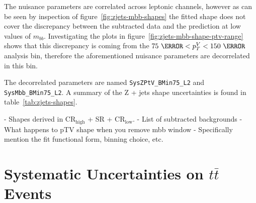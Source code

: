 The nuisance parameters are correlated across leptonic channels, however as can
be seen by inspection of figure~\ref{fig:zjets-mbb-shapes} the fitted shape does
not cover the discrepancy between the subtracted data and the prediction at low
values of $m_{bb}$. Investigating the plots in
figure~\ref{fig:zjets-mbb-shape-ptv-range} shows that this discrepancy is coming
from the $75~\GeV < p_T^V < 150~\GeV$ analysis bin, therefore the aforementioned
nuisance parameters are decorrelated in this bin.

The decorrelated parameters are named \texttt{SysZPtV\_BMin75\_L2} and
\texttt{SysMbb\_BMin75\_L2}. A summary of the Z + jets shape uncertainties is
found in table~\ref{tab:zjets-shapes}.


- Shapes derived in CR$_{\text{high}}$ + SR + CR$_{\text{low}}$.
- List of subtracted backgrounds
- What happens to pTV shape when you remove mbb window
- Specifically mention the fit functional form, binning choice, etc. 

\section{Systematic Uncertainties on \texorpdfstring{$t\bar{t}$}{tt} Events}







